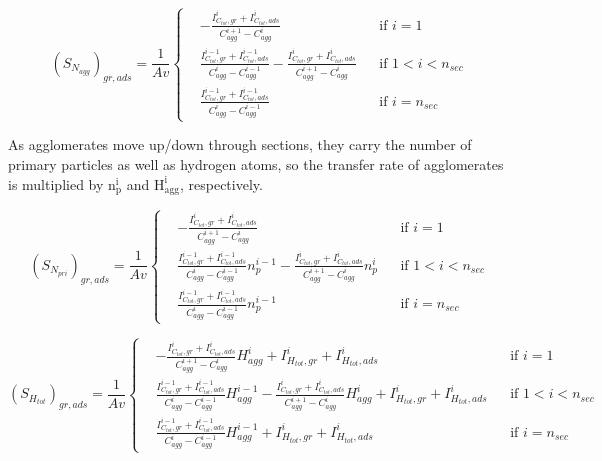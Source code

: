 \begin{equation}
	\left(S_{N_{agg}}\right)_{gr, ads}=
	\frac{1}{Av}
	\left\{
	\begin{aligned}
		&-\frac{I^i_{C_{tot},gr}+I^i_{C_{tot},ads}}{C^{i+1}_{agg}-C^{i}_{agg}}
		&&
		\text{if } i = 1
		\\
		&\frac{I^{i-1}_{C_{tot},gr}+I^{i-1}_{C_{tot},ads}}{C^{i}_{agg}-C^{i-1}_{agg}}
		-\frac{I^{i}_{C_{tot},gr}+I^{i}_{C_{tot},ads}}{C^{i+1}_{agg}-C^{i}_{agg}}
		&&
		\text{if } 1 < i < n_{sec}
		\\
		&\frac{I^{i-1}_{C_{tot},gr}+I^{i-1}_{C_{tot},ads}}{C^{i}_{agg}-C^{i-1}_{agg}}
		&&\text{if } i=n_{sec}
	\end{aligned}
	\right.
	\label{eqn:S_Nagg_gradssect}
\end{equation}

As agglomerates move up/down through sections, they carry the number of primary particles as well as hydrogen atoms, so the transfer rate of agglomerates is multiplied by $\mathrm{n^i_p}$ and $\mathrm{H^i_{agg}}$, respectively. 

\begin{equation}
	\left(S_{N_{pri}}\right)_{gr, ads}=
	\frac{1}{Av}
	\left\{
	\begin{aligned}
		&-\frac{I^i_{C_{tot},gr}+I^i_{C_{tot},ads}}{C^{i+1}_{agg}-C^{i}_{agg}}
		&&
		\text{if } i = 1
		\\
		&\frac{I^{i-1}_{C_{tot},gr}+I^{i-1}_{C_{tot},ads}}{C^{i}_{agg}-C^{i-1}_{agg}}n^{i-1}_p
		-\frac{I^{i}_{C_{tot},gr}+I^{i}_{C_{tot},ads}}{C^{i+1}_{agg}-C^{i}_{agg}}n^{i}_p
		&&
		\text{if } 1 < i < n_{sec}
		\\
		&\frac{I^{i-1}_{C_{tot},gr}+I^{i-1}_{C_{tot},ads}}{C^{i}_{agg}-C^{i-1}_{agg}}n^{i-1}_p
		&&\text{if } i=n_{sec}
	\end{aligned}
	\right.
	\label{eqn:S_Npri_gradssect}
\end{equation}

\begin{equation}
	\left(S_{H_{tot}}\right)_{gr, ads}=
	\frac{1}{Av}
	\left\{
	\begin{aligned}
		&-\frac{I^i_{C_{tot},gr}+I^i_{C_{tot},ads}}{C^{i+1}_{agg}-C^{i}_{agg}}H^{i}_{agg} 
		+ I^{i}_{H_{tot}, gr} + I^{i}_{H_{tot}, ads}
		&&
		\text{if } i = 1
		\\
		&\frac{I^{i-1}_{C_{tot},gr}+I^{i-1}_{C_{tot},ads}}{C^{i}_{agg}-C^{i-1}_{agg}}H^{i-1}_{agg}
		-\frac{I^{i}_{C_{tot},gr}+I^{i}_{C_{tot},ads}}{C^{i+1}_{agg}-C^{i}_{agg}}H^{i}_{agg}
		+ I^{i}_{H_{tot}, gr} + I^{i}_{H_{tot}, ads}
		&&
		\text{if } 1 < i < n_{sec}
		\\
		&\frac{I^{i-1}_{C_{tot},gr}+I^{i-1}_{C_{tot},ads}}{C^{i}_{agg}-C^{i-1}_{agg}}H^{i-1}_{agg}
		+ I^{i}_{H_{tot}, gr} + I^{i}_{H_{tot}, ads}
		&&\text{if } i=n_{sec}
	\end{aligned}
	\right.
	\label{eqn:S_Htot_gradssect}
\end{equation}

